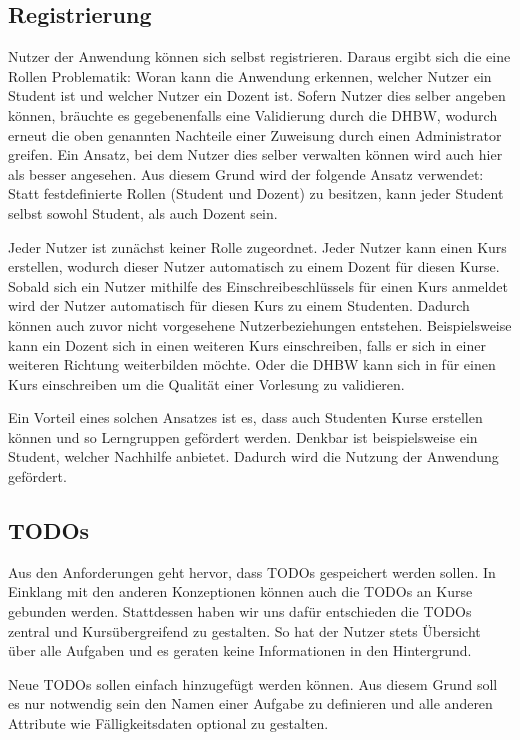 \subsection{Registrierung}
Nutzer der Anwendung können sich selbst registrieren.
Daraus ergibt sich die eine Rollen Problematik: Woran kann die Anwendung erkennen, welcher Nutzer ein Student ist und welcher Nutzer ein Dozent ist.
Sofern Nutzer dies selber angeben können, bräuchte es gegebenenfalls eine Validierung durch die DHBW, wodurch erneut die oben genannten Nachteile einer Zuweisung durch einen Administrator greifen.
Ein Ansatz, bei dem Nutzer dies selber verwalten können wird auch hier als besser angesehen.
Aus diesem Grund wird der folgende Ansatz verwendet:
Statt festdefinierte Rollen (Student und Dozent) zu besitzen, kann jeder Student selbst sowohl Student, als auch Dozent sein.

Jeder Nutzer ist zunächst keiner Rolle zugeordnet.
Jeder Nutzer kann einen Kurs erstellen, wodurch dieser Nutzer automatisch zu einem Dozent für diesen Kurse.
Sobald sich ein Nutzer mithilfe des Einschreibeschlüssels für einen Kurs anmeldet wird der Nutzer automatisch für diesen Kurs zu einem Studenten.
Dadurch können auch zuvor nicht vorgesehene Nutzerbeziehungen entstehen.
Beispielsweise kann ein Dozent sich in einen weiteren Kurs einschreiben, falls er sich in einer weiteren Richtung weiterbilden möchte.
Oder die DHBW kann sich in für einen Kurs einschreiben um die Qualität einer Vorlesung zu validieren.


Ein Vorteil eines solchen Ansatzes ist es, dass auch Studenten Kurse erstellen können und so Lerngruppen gefördert werden.
Denkbar ist beispielsweise ein Student, welcher Nachhilfe anbietet.
Dadurch wird die Nutzung der Anwendung gefördert.








\subsection{TODOs}
Aus den Anforderungen geht hervor, dass TODOs gespeichert werden sollen. In Einklang mit den anderen Konzeptionen können auch die TODOs an Kurse gebunden werden. Stattdessen haben wir uns dafür entschieden die TODOs zentral und Kursübergreifend zu gestalten. So hat der Nutzer stets Übersicht über alle Aufgaben und es geraten keine Informationen in den Hintergrund.

Neue TODOs sollen einfach hinzugefügt werden können. Aus diesem Grund soll es nur notwendig sein den Namen einer Aufgabe zu definieren und alle anderen Attribute wie Fälligkeitsdaten optional zu gestalten.

